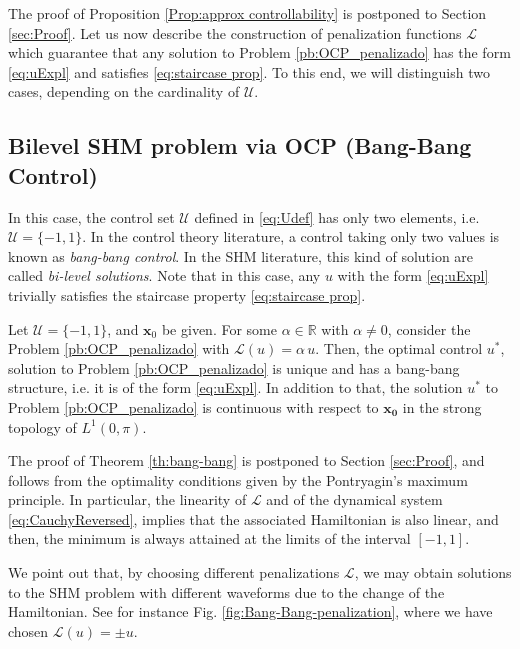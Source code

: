 \documentclass[9pt,shortpaper,twoside,web]{ieeecolor}
\begin{document}
The proof of Proposition \ref{Prop:approx controllability} is postponed to Section \ref{sec:Proof}. Let us now describe the construction of penalization functions $\mathcal{L}$ which guarantee that any solution to Problem \ref{pb:OCP_penalizado} has the form \eqref{eq:uExpl} and satisfies \eqref{eq:staircase prop}. To this end, we will distinguish two cases, depending on the cardinality of $\mathcal{U}$.

\subsection{Bilevel SHM problem via OCP (Bang-Bang Control)} 

In this case, the control set $\mathcal{U}$ defined in \eqref{eq:Udef} has only two elements, i.e.  $\mathcal{U}=\{-1,1\}$.
In the control theory literature, a control taking only two values is known as \emph{bang-bang control}. In the SHM literature, this kind of solution are called \textit{bi-level solutions}. Note that in this case, any $u$ with the form \eqref{eq:uExpl}  trivially satisfies the staircase property \eqref{eq:staircase prop}.

\begin{theorem}\label{th:bang-bang}
	Let $\mathcal{U}=\{ -1, 1\}$, and $\bm{x}_0$ be given.  For some $\alpha\in \mathbb{R}$ with $\alpha\neq 0$, consider the Problem \ref{pb:OCP_penalizado} with $\mathcal{L} (u) = \alpha\, u$. Then, the optimal control $u^\ast$, solution to Problem \ref{pb:OCP_penalizado} is unique and has a bang-bang structure, i.e. it is of the form \eqref{eq:uExpl}. In addition to that, the solution $u^\ast$ to Problem \ref{pb:OCP_penalizado} is continuous  with respect to $\bm{x_0}$ in the strong topology of $L^1(0,\pi)$.
\end{theorem}

The proof of Theorem \ref{th:bang-bang} is postponed to Section \ref{sec:Proof}, and follows from the optimality conditions given by the Pontryagin's maximum principle. In particular, the linearity of $\mathcal{L}$ and of  the dynamical system \eqref{eq:CauchyReversed}, implies that the associated Hamiltonian is also  linear, and then, the minimum is always attained at the limits of the interval $[-1,1]$.

We point out that, by choosing different penalizations $\mathcal{L}$, we may obtain solutions to the SHM problem with different waveforms due to the change of the Hamiltonian. See for instance Fig. \ref{fig:Bang-Bang-penalization}, where we have chosen $\mathcal{L}(u) = \pm u$.
\end{document}
